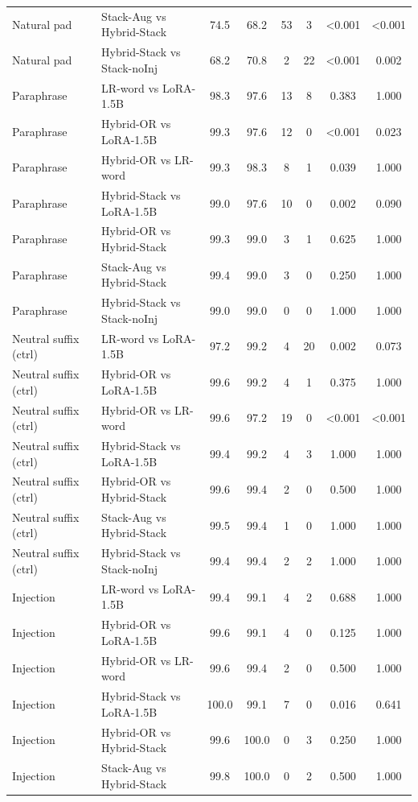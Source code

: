 \begin{table}[t]
\begin{tabular}{llcccccc}
Natural pad & Stack-Aug vs Hybrid-Stack & 74.5 & 68.2 & 53 & 3 & <0.001 & <0.001 \\
Natural pad & Hybrid-Stack vs Stack-noInj & 68.2 & 70.8 & 2 & 22 & <0.001 & 0.002 \\
Paraphrase & LR-word vs LoRA-1.5B & 98.3 & 97.6 & 13 & 8 & 0.383 & 1.000 \\
Paraphrase & Hybrid-OR vs LoRA-1.5B & 99.3 & 97.6 & 12 & 0 & <0.001 & 0.023 \\
Paraphrase & Hybrid-OR vs LR-word & 99.3 & 98.3 & 8 & 1 & 0.039 & 1.000 \\
Paraphrase & Hybrid-Stack vs LoRA-1.5B & 99.0 & 97.6 & 10 & 0 & 0.002 & 0.090 \\
Paraphrase & Hybrid-OR vs Hybrid-Stack & 99.3 & 99.0 & 3 & 1 & 0.625 & 1.000 \\
Paraphrase & Stack-Aug vs Hybrid-Stack & 99.4 & 99.0 & 3 & 0 & 0.250 & 1.000 \\
Paraphrase & Hybrid-Stack vs Stack-noInj & 99.0 & 99.0 & 0 & 0 & 1.000 & 1.000 \\
Neutral suffix (ctrl) & LR-word vs LoRA-1.5B & 97.2 & 99.2 & 4 & 20 & 0.002 & 0.073 \\
Neutral suffix (ctrl) & Hybrid-OR vs LoRA-1.5B & 99.6 & 99.2 & 4 & 1 & 0.375 & 1.000 \\
Neutral suffix (ctrl) & Hybrid-OR vs LR-word & 99.6 & 97.2 & 19 & 0 & <0.001 & <0.001 \\
Neutral suffix (ctrl) & Hybrid-Stack vs LoRA-1.5B & 99.4 & 99.2 & 4 & 3 & 1.000 & 1.000 \\
Neutral suffix (ctrl) & Hybrid-OR vs Hybrid-Stack & 99.6 & 99.4 & 2 & 0 & 0.500 & 1.000 \\
Neutral suffix (ctrl) & Stack-Aug vs Hybrid-Stack & 99.5 & 99.4 & 1 & 0 & 1.000 & 1.000 \\
Neutral suffix (ctrl) & Hybrid-Stack vs Stack-noInj & 99.4 & 99.4 & 2 & 2 & 1.000 & 1.000 \\
Injection & LR-word vs LoRA-1.5B & 99.4 & 99.1 & 4 & 2 & 0.688 & 1.000 \\
Injection & Hybrid-OR vs LoRA-1.5B & 99.6 & 99.1 & 4 & 0 & 0.125 & 1.000 \\
Injection & Hybrid-OR vs LR-word & 99.6 & 99.4 & 2 & 0 & 0.500 & 1.000 \\
Injection & Hybrid-Stack vs LoRA-1.5B & 100.0 & 99.1 & 7 & 0 & 0.016 & 0.641 \\
Injection & Hybrid-OR vs Hybrid-Stack & 99.6 & 100.0 & 0 & 3 & 0.250 & 1.000 \\
Injection & Stack-Aug vs Hybrid-Stack & 99.8 & 100.0 & 0 & 2 & 0.500 & 1.000 \\

\end{tabular}
\end{table}
